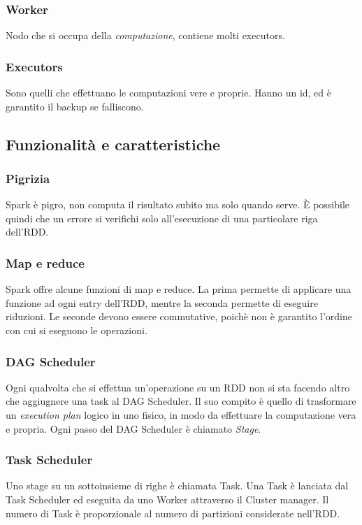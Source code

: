 \subsubsection{Worker}
Nodo che si occupa della \emph{computazione}, contiene molti executors.

\subsubsection{Executors}
Sono quelli che effettuano le computazioni vere e proprie. Hanno un id, ed è 
garantito il backup se falliscono.

\subsection{Funzionalità e caratteristiche}

\subsubsection{Pigrizia}
Spark è pigro, non computa il risultato subito ma solo quando serve. 
È possibile quindi che un errore si verifichi solo all'esecuzione di una particolare 
riga dell'RDD.

\subsubsection{Map e reduce}
Spark offre alcune funzioni di map e reduce. La prima permette di applicare una funzione
ad ogni entry dell'RDD, mentre la seconda permette di eseguire riduzioni. Le seconde devono essere
commutative, poichè non è garantito l'ordine con cui si eseguono le operazioni.

\subsubsection{DAG Scheduler}
Ogni qualvolta che si effettua un'operazione su un RDD non si sta facendo altro che 
aggiugnere una task al DAG Scheduler. Il suo compito è quello di trasformare un 
\emph{execution plan} logico in uno fisico, in modo da effettuare la computazione vera e propria.
Ogni passo del DAG Scheduler è chiamato \emph{Stage}.

\subsubsection{Task Scheduler}
Uno stage su un sottoinsieme di righe è chiamata Task.
Una Task è lanciata dal Task Scheduler ed eseguita da uno Worker 
attraverso il Cluster manager. Il numero 
di Task è proporzionale al numero di partizioni considerate nell'RDD.


